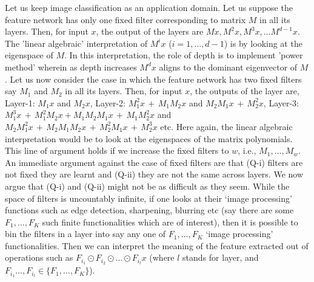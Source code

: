 Let us keep image classification as an application domain. Let us suppose the feature network has only one fixed filter corresponding to matrix $M$ in all its layers. Then, for input $x$, the output of the layers are $Mx, M^2x, M^3x,\ldots M^{d-1}x$. The 'linear algebraic' interpretation of $M^i x$ ($i=1,\ldots,d-1$) is by looking at the eigenspace of $M$. In this interpretation, the role of depth is to implement 'power method' wherein as depth increases $M^d x$ aligns to the dominant eigenvector of $M$. Let us now consider the case in which the feature network has two fixed filters say $M_1$ and $M_2$ in all its layers. Then, for input $x$, the outputs of the layer are, Layer-1: $M_1x$ and  $M_2x$, Layer-2: $M^2_1x\,+\,M_1M_2x$ and $M_2M_1x \,+\, M^2_2x$, Layer-3:  $M^3_1x\,+\,M^2_1M_2x+ M_1M_2M_1x \,+\, M_1M^2_2x$ and $M_2M^2_1x\,+\,M_2M_1M_2x \,+\, M^2_2M_1x \,+\, M^3_2x$ etc. Here again, the linear algebraic interpretation would be to look at the eigenspaces of the matrix polynomials. This line of argument holds if we increase the fixed filters to $w$, i.e., $M_1,\ldots, M_w$. An immediate argument against the case of fixed filters are that (Q-i) filters are not fixed they are learnt and (Q-ii) they are not the same across layers. We now argue that (Q-i) and (Q-ii) might not be as difficult as they seem. While the space of filters is uncountably infinite, if one looks at their `image processing' functions such as edge detection, sharpening, blurring etc (say there are some $F_1,\ldots, F_K$ such finite functionalities which are of interest), then it is possible to bin the filters in a layer into say any one of $F_1,\ldots, F_K$ `image processing' functionalities. Then we can interpret the meaning of the feature extracted out of operations such as $F_{i_1} \odot F_{i_2}\odot \ldots \odot F_{i_l}x$ (where $l$ stands for layer, and $F_{i_1}\ldots,F_{i_l}\in\{F_1,\ldots, F_K\}$). 


